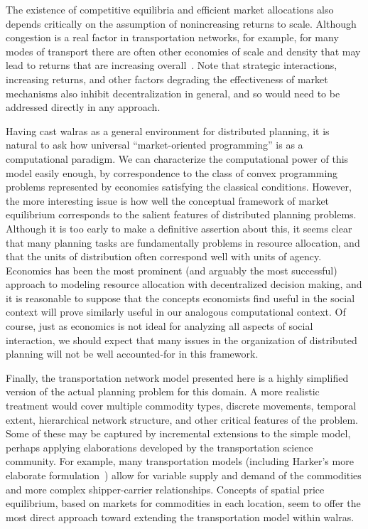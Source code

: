 The existence of competitive equilibria and efficient market allocations also depends
critically on the assumption of nonincreasing returns to scale.
Although congestion is a real factor in transportation networks, for 
example, for many modes of transport
there are often other economies of scale and density that may lead to returns that are
increasing overall~\cite{Harker87}.
Note that strategic interactions, increasing returns, and other factors
degrading the effectiveness of market mechanisms also inhibit decentralization
in general, and so would need to be addressed directly in any approach. 

Having cast {\sc walras} as a general environment for distributed planning,
it is natural to ask how universal
``market-oriented programming'' is as a computational paradigm.
We can characterize the computational power of this model easily enough,
by correspondence to the class of convex programming problems represented by
economies satisfying the classical conditions.
However, the more interesting issue is how well the conceptual framework of 
market equilibrium corresponds to the salient features of distributed planning problems.
Although it is too early to make a definitive assertion about this, it seems clear that
many planning tasks are fundamentally problems in resource allocation, and that the units
of distribution often correspond well with units of agency.
Economics has been the most prominent (and arguably the most successful) approach to 
modeling resource allocation with decentralized decision making, and it is reasonable to
suppose that the concepts economists find useful in the social
context will prove similarly useful in our analogous computational context.
Of course, just as economics is not ideal for analyzing all aspects of social
interaction, we should expect that many issues in the organization of distributed planning 
will not be well accounted-for in this framework.

Finally, the transportation network model presented here is a highly 
simplified version of the actual planning problem for this domain.
A more realistic treatment would cover multiple commodity types, 
discrete movements, temporal extent, hierarchical network structure, and 
other critical features of the problem.  Some of these may be captured by 
incremental extensions to the simple model, perhaps applying elaborations 
developed by the transportation science community.  For example, 
many transportation models (including Harker's more elaborate 
formulation~\cite{Harker87}) allow for variable supply and demand of the 
commodities and more complex shipper-carrier relationships.
Concepts of spatial price equilibrium, based on markets for 
commodities in each location, seem to offer the most direct 
approach toward extending the transportation model within {\sc walras}.

